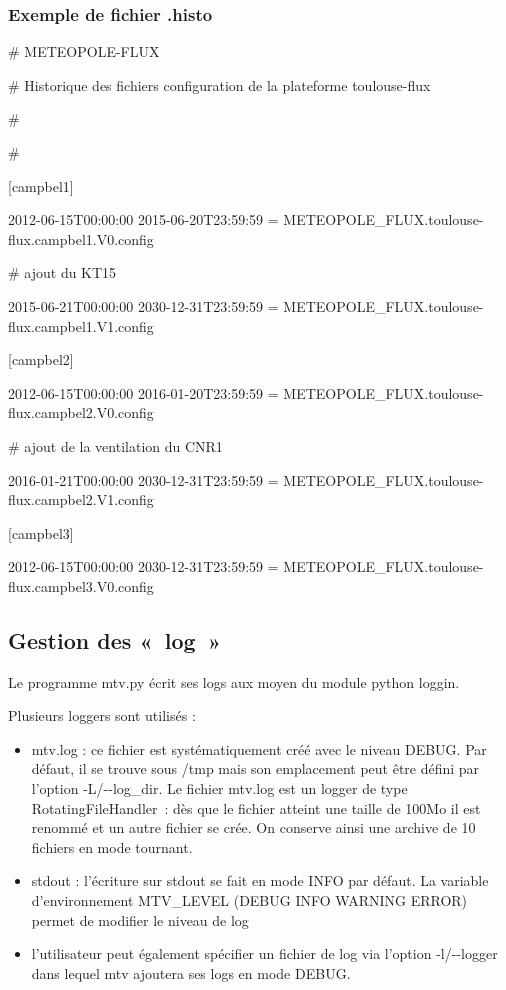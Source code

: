 {\subsubsection{Exemple de fichier .histo}
\# METEOPOLE-FLUX

\# Historique des fichiers configuration de la plateforme toulouse-flux

\#

\#

[campbel1]

2012-06-15T00:00:00 2015-06-20T23:59:59 = METEOPOLE\_FLUX.toulouse-flux.campbel1.V0.config

\# ajout du KT15

2015-06-21T00:00:00 2030-12-31T23:59:59 = METEOPOLE\_FLUX.toulouse-flux.campbel1.V1.config



[campbel2]

2012-06-15T00:00:00 2016-01-20T23:59:59 = METEOPOLE\_FLUX.toulouse-flux.campbel2.V0.config

\# ajout de la ventilation du CNR1

2016-01-21T00:00:00 2030-12-31T23:59:59 = METEOPOLE\_FLUX.toulouse-flux.campbel2.V1.config



[campbel3]

2012-06-15T00:00:00 2030-12-31T23:59:59 = METEOPOLE\_FLUX.toulouse-flux.campbel3.V0.config



\subsection{Gestion des «~log~»}
Le programme mtv.py écrit ses logs aux moyen du module python loggin.

Plusieurs loggers sont utilisés :

\begin{itemize}
\item mtv.log : ce fichier est systématiquement créé avec le niveau DEBUG. Par défaut, il se trouve sous /tmp mais son
emplacement peut être défini par l'option {}-L/-{}-log\_dir. Le fichier mtv.log est un logger de type
RotatingFileHandler~: dès que le fichier atteint une taille de 100Mo il est renommé et un autre fichier se crée. On
conserve ainsi une archive de 10 fichiers en mode tournant.
\item stdout : l'écriture sur stdout se fait en mode INFO par défaut. La variable d'environnement MTV\_LEVEL (DEBUG
{\textbar} INFO {\textbar} WARNING {\textbar} ERROR) permet de modifier le niveau de log
\item l'utilisateur peut également spécifier un fichier de log via l'option -l/-{}-logger dans lequel mtv ajoutera ses
logs en mode DEBUG.
\end{itemize}

}
